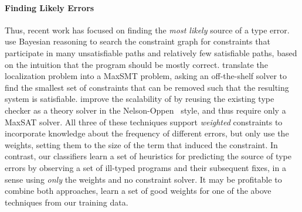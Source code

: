 \paragraph{Finding Likely Errors}
Thus, recent work has focused on finding the \emph{most likely} source
of a type error.
%
\citet{Zhang2014-lv} use Bayesian reasoning to search the constraint
graph for constraints that participate in many unsatisfiable paths and
relatively few satisfiable paths, based on the intuition that the
program should be mostly correct.
%
\citet{Pavlinovic2014-mr} translate the localization problem into a
MaxSMT problem, asking an off-the-shelf solver to find the smallest
set of constraints that can be removed such that the resulting system is
satisfiable.
%
\citet{Loncaric2016-uk} improve the scalability of
\citeauthor{Pavlinovic2014-mr} by reusing the existing type checker as
a theory solver in the Nelson-Oppen~\citeyear{Nelson1979-td}
style, and thus require only a MaxSAT solver.
%
All three of these techniques support \emph{weighted} constraints to
incorporate knowledge about the frequency of different errors,
but only \citeauthor{Pavlinovic2014-mr} use the weights, setting them to
the size of the term that induced the constraint.
%
In contrast, our classifiers learn a set of heuristics for predicting
the source of type errors by observing a set of ill-typed programs and
their subsequent fixes, in a sense using \emph{only} the weights and no
constraint solver.
%
It may be profitable to combine both approaches, \ie learn a set of good
weights for one of the above techniques from our training data.

